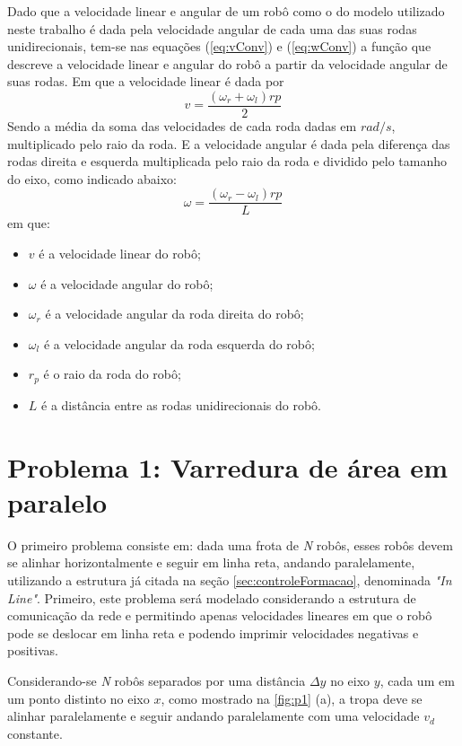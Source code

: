 Dado que a velocidade linear e angular de um robô como o do modelo utilizado neste trabalho é dada pela velocidade angular de cada uma das suas rodas unidirecionais, tem-se nas equações (\ref{eq:vConv}) e (\ref{eq:wConv}) a função que descreve a velocidade linear e angular do robô a partir da velocidade angular de suas rodas. Em que a velocidade linear é dada por
\begin{equation}
	v = \dfrac{(\omega_{r} + \omega_{l}) rp}{2}
	\label{eq:vConv}
\end{equation}
Sendo a média da soma das velocidades de cada roda dadas em $rad/s$, multiplicado pelo raio da roda. E a velocidade angular é dada pela diferença das rodas  direita e esquerda  multiplicada pelo raio da roda e dividido pelo tamanho do eixo, como indicado abaixo:
\begin{equation}
	\omega = \dfrac{(\omega_{r} - \omega_{l}) rp}{L}
	\label{eq:wConv}
\end{equation}
em que:
\begin{itemize}
	\item $v$ é a velocidade linear do robô;
	\item $\omega$ é a velocidade angular do robô;
	\item $\omega_{r}$ é a velocidade angular da roda direita do robô;
	\item $\omega_{l}$ é a velocidade angular da roda esquerda do robô;
	\item $r_{p}$ é o raio da roda do robô;
	\item $L$ é a distância entre as rodas unidirecionais do robô.
\end{itemize}

\section{Problema 1: Varredura de área em paralelo}
\label{sec:P1}
O primeiro problema consiste em: dada uma frota de \emph{N} robôs, esses robôs devem se alinhar horizontalmente e seguir em linha reta, andando paralelamente, utilizando a estrutura já citada na seção \ref{sec:controleFormacao}, denominada \emph{"In Line"}. Primeiro, este problema será modelado considerando a estrutura de comunicação da rede e permitindo apenas velocidades lineares em que o robô pode se deslocar em linha reta e podendo imprimir velocidades negativas e positivas. 

Considerando-se \emph{N} robôs separados por uma distância $\Delta$$y$ no eixo $y$, cada um em um ponto distinto no eixo $x$, como mostrado na \autoref{fig:p1} (a), a tropa deve se alinhar paralelamente e seguir andando paralelamente com uma velocidade $v_{d}$ constante.

